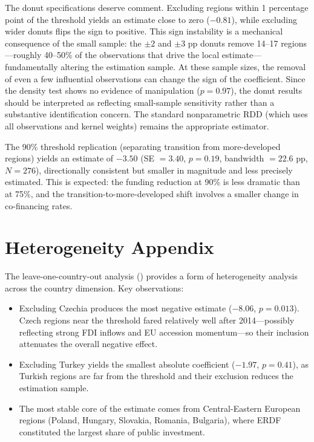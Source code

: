 \documentclass[12pt]{article}
\begin{document}
The donut specifications deserve comment. Excluding regions within 1 percentage point of the threshold yields an estimate close to zero ($-0.81$), while excluding wider donuts flips the sign to positive. This sign instability is a mechanical consequence of the small sample: the $\pm 2$ and $\pm 3$ pp donuts remove 14--17 regions---roughly 40--50\% of the observations that drive the local estimate---fundamentally altering the estimation sample. At these sample sizes, the removal of even a few influential observations can change the sign of the coefficient. Since the density test shows no evidence of manipulation ($p = 0.97$), the donut results should be interpreted as reflecting small-sample sensitivity rather than a substantive identification concern. The standard nonparametric RDD (which uses all observations and kernel weights) remains the appropriate estimator.

The 90\% threshold replication (separating transition from more-developed regions) yields an estimate of $-3.50$ (SE $= 3.40$, $p = 0.19$, bandwidth $= 22.6$ pp, $N = 276$), directionally consistent but smaller in magnitude and less precisely estimated. This is expected: the funding reduction at 90\% is less dramatic than at 75\%, and the transition-to-more-developed shift involves a smaller change in co-financing rates.

\section{Heterogeneity Appendix}
\label{sec:appendix_hetero}

The leave-one-country-out analysis () provides a form of heterogeneity analysis across the country dimension. Key observations:

\begin{itemize}
    \item Excluding Czechia produces the most negative estimate ($-8.06$, $p = 0.013$). Czech regions near the threshold fared relatively well after 2014---possibly reflecting strong FDI inflows and EU accession momentum---so their inclusion attenuates the overall negative effect.
    \item Excluding Turkey yields the smallest absolute coefficient ($-1.97$, $p = 0.41$), as Turkish regions are far from the threshold and their exclusion reduces the estimation sample.
    \item The most stable core of the estimate comes from Central-Eastern European regions (Poland, Hungary, Slovakia, Romania, Bulgaria), where ERDF constituted the largest share of public investment.
\end{itemize}
\end{document}

